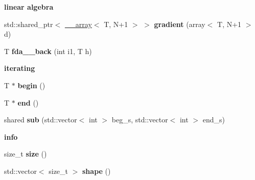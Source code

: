 \begin{Indent}{\bf linear algebra}\par
{\em \label{_amgrpdbb97692ebc717958fffd4987443ddaf}
 }\begin{DoxyCompactItemize}
\item 
\hypertarget{class____array_a0f07f0f2bfe9a0da0aa3744b0d48d390}{
std::shared\_\-ptr$<$ \hyperlink{class____array}{\_\-\_\-array}$<$ T, N+1 $>$ $>$ {\bfseries gradient} (array$<$ T, N+1 $>$ d)}
\label{class____array_a0f07f0f2bfe9a0da0aa3744b0d48d390}

\item 
\hypertarget{class____array_aa549bf171a0c581f65925c7eae47ffb2}{
T {\bfseries fda\_\_\-back} (int i1, T h)}
\label{class____array_aa549bf171a0c581f65925c7eae47ffb2}

\end{DoxyCompactItemize}
\end{Indent}
\begin{Indent}{\bf iterating}\par
{\em \label{_amgrpc920236de44765917757f8b46bb8ccda}
 }\begin{DoxyCompactItemize}
\item 
\hypertarget{class____array_a9e073ed33e0fad10acbbb001af3c10b1}{
T $\ast$ {\bfseries begin} ()}
\label{class____array_a9e073ed33e0fad10acbbb001af3c10b1}

\item 
\hypertarget{class____array_a0e7f0ce953b4d180a940c14e34b503db}{
T $\ast$ {\bfseries end} ()}
\label{class____array_a0e7f0ce953b4d180a940c14e34b503db}

\item 
\hypertarget{class____array_a00efa91c7d776a4afb2d1334a0d05b83}{
shared {\bfseries sub} (std::vector$<$ int $>$ beg\_\-s, std::vector$<$ int $>$ end\_\-s)}
\label{class____array_a00efa91c7d776a4afb2d1334a0d05b83}

\end{DoxyCompactItemize}
\end{Indent}
\begin{Indent}{\bf info}\par
{\em \label{_amgrpcaf9b6b99962bf5c2264824231d7a40c}
 }\begin{DoxyCompactItemize}
\item 
\hypertarget{class____array_abbc3e2f4041747fdb3de9b224db7cb1e}{
size\_\-t {\bfseries size} ()}
\label{class____array_abbc3e2f4041747fdb3de9b224db7cb1e}

\item 
\hypertarget{class____array_a0339a0c0f5a858f98bc8c8a3792c73ed}{
std::vector$<$ size\_\-t $>$ {\bfseries shape} ()}
\label{class____array_a0339a0c0f5a858f98bc8c8a3792c73ed}

\end{DoxyCompactItemize}
\end{Indent}

